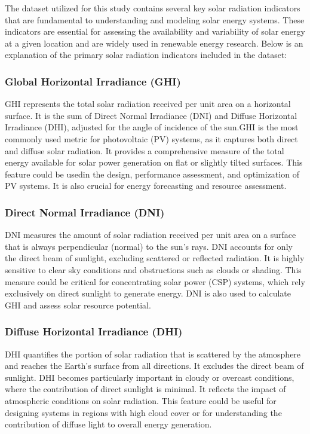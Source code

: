 \documentclass[10pt,twocolumn]{article}
\begin{document}
The dataset utilized for this study contains several key solar radiation indicators that are fundamental to understanding and modeling solar energy systems. These indicators are essential for assessing the availability and variability of solar energy at a given location and are widely used in renewable energy research. Below is an explanation of the primary solar radiation indicators included in the dataset:

\subsubsection{Global Horizontal Irradiance (GHI)}
\begin{itemize}
     GHI represents the total solar radiation received per unit area on a horizontal surface\cite{7}. It is the sum of Direct Normal Irradiance (DNI) and Diffuse Horizontal Irradiance (DHI), adjusted for the angle of incidence of the sun.GHI is the most commonly used metric for photovoltaic (PV) systems, as it captures both direct and diffuse solar radiation\cite{7}. It provides a comprehensive measure of the total energy available for solar power generation on flat or slightly tilted surfaces. This feature could be usedin the design, performance assessment, and optimization of PV systems. It is also crucial for energy forecasting and resource assessment.
\end{itemize}

\subsubsection{Direct Normal Irradiance (DNI)}
\begin{itemize}
     DNI measures the amount of solar radiation received per unit area on a surface that is always perpendicular (normal) to the sun's rays. DNI accounts for only the direct beam of sunlight, excluding scattered or reflected radiation. It is highly sensitive to clear sky conditions and obstructions such as clouds or shading\cite{17}. This measure could be critical for concentrating solar power (CSP) systems, which rely exclusively on direct sunlight to generate energy\cite{17}. DNI is also used to calculate GHI and assess solar resource potential.
\end{itemize}

\subsubsection{Diffuse Horizontal Irradiance (DHI)}
\begin{itemize}
    DHI quantifies the portion of solar radiation that is scattered by the atmosphere and reaches the Earth's surface from all directions. It excludes the direct beam of sunlight. DHI becomes particularly important in cloudy or overcast conditions, where the contribution of direct sunlight is minimal\cite{17}. It reflects the impact of atmospheric conditions on solar radiation. This feature could be useful for designing systems in regions with high cloud cover or for understanding the contribution of diffuse light to overall energy generation\cite{17}.
\end{itemize}
\end{document}
